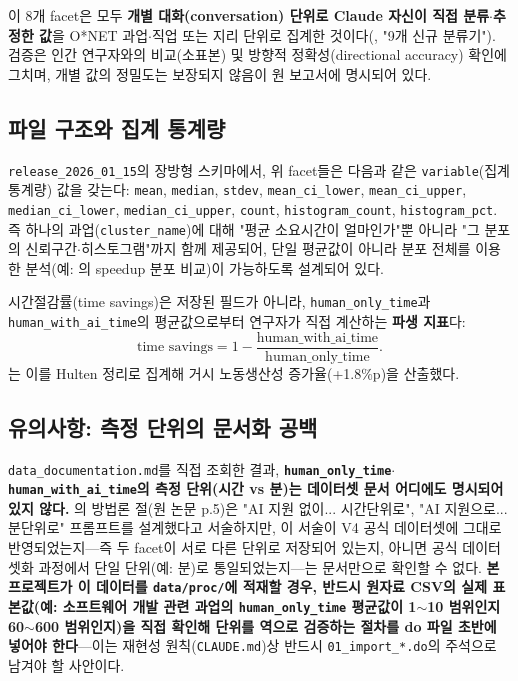 \documentclass[11pt]{article}
\begin{document}
이 8개 facet은 모두 \textbf{개별 대화(conversation) 단위로 Claude 자신이 직접 분류$\cdot$추정한 값}을 O*NET 과업$\cdot$직업 또는 지리 단위로 집계한 것이다(\citealp{appel-2026-economic-primitives}, "9개 신규 분류기"). 검증은 인간 연구자와의 비교(소표본) 및 방향적 정확성(directional accuracy) 확인에 그치며, 개별 값의 정밀도는 보장되지 않음이 원 보고서에 명시되어 있다.

\subsection{파일 구조와 집계 통계량}

\texttt{release\_2026\_01\_15}의 장방형 스키마에서, 위 facet들은 다음과 같은 \texttt{variable}(집계통계량) 값을 갖는다: \texttt{mean}, \texttt{median}, \texttt{stdev}, \texttt{mean\_ci\_lower}, \texttt{mean\_ci\_upper}, \texttt{median\_ci\_lower}, \texttt{median\_ci\_upper}, \texttt{count}, \texttt{histogram\_count}, \texttt{histogram\_pct}. 즉 하나의 과업(\texttt{cluster\_name})에 대해 "평균 소요시간이 얼마인가"뿐 아니라 "그 분포의 신뢰구간$\cdot$히스토그램"까지 함께 제공되어, 단일 평균값이 아니라 분포 전체를 이용한 분석(예: \citealp{appel-2026-economic-primitives}의 speedup 분포 비교)이 가능하도록 설계되어 있다.

시간절감률(time savings)은 저장된 필드가 아니라, \texttt{human\_only\_time}과 \texttt{human\_with\_ai\_time}의 평균값으로부터 연구자가 직접 계산하는 \textbf{파생 지표}다:
\[
\text{time savings} = 1 - \frac{\text{human\_with\_ai\_time}}{\text{human\_only\_time}}.
\]
\citet{tamkin-2025-estimating-ai-productivity-gains-from}는 이를 Hulten 정리로 집계해 거시 노동생산성 증가율(+1.8\%p)을 산출했다.

\subsection{유의사항: 측정 단위의 문서화 공백}
\label{sec:time-caveat}

\texttt{data\_documentation.md}를 직접 조회한 결과, \textbf{\texttt{human\_only\_time}$\cdot$\texttt{human\_with\_ai\_time}의 측정 단위(시간 vs 분)는 데이터셋 문서 어디에도 명시되어 있지 않다.} \citet{tamkin-2025-estimating-ai-productivity-gains-from}의 방법론 절(원 논문 p.5)은 "AI 지원 없이... 시간단위로", "AI 지원으로... 분단위로" 프롬프트를 설계했다고 서술하지만, 이 서술이 V4 공식 데이터셋에 그대로 반영되었는지---즉 두 facet이 서로 다른 단위로 저장되어 있는지, 아니면 공식 데이터셋화 과정에서 단일 단위(예: 분)로 통일되었는지---는 문서만으로 확인할 수 없다. \textbf{본 프로젝트가 이 데이터를 \texttt{data/proc/}에 적재할 경우, 반드시 원자료 CSV의 실제 표본값(예: 소프트웨어 개발 관련 과업의 \texttt{human\_only\_time} 평균값이 1$\sim$10 범위인지 60$\sim$600 범위인지)을 직접 확인해 단위를 역으로 검증하는 절차를 do 파일 초반에 넣어야 한다}---이는 재현성 원칙(\texttt{CLAUDE.md})상 반드시 \texttt{01\_import\_*.do}의 주석으로 남겨야 할 사안이다.
\end{document}
